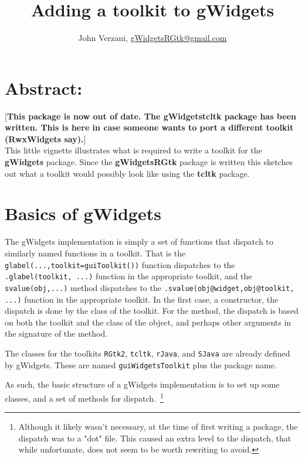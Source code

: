 \documentclass[12pt]{article}
\newcommand{\RCode}[1]{\texttt{#1}}
\newcommand{\RPackage}[1]{\textbf{#1}}
\begin{document}
\thispagestyle{plain}
\title{Adding a toolkit to gWidgets}

\author{John Verzani, \url{gWidgetsRGtk@gmail.com}}
\maketitle

\section*{Abstract:}
[\textbf{This package is now out of date. The \RPackage{gWidgetstcltk} package
has been written. This is here in case someone wants to port a
different toolkit (RwxWidgets say).}]
\\

This little vignette illustrates what is required to write a toolkit
for the \RPackage{gWidgets} package. Since the \RPackage{gWidgetsRGtk}
package is written this sketches out what a toolkit would possibly
look like using the \RPackage{tcltk} package.

\setcounter{tocdepth}{3}
\tableofcontents

\section{Basics of gWidgets}

The gWidgets implementation is simply a set of functions that dispatch
to similarly named functions in a toolkit. That is the
\RCode{glabel(...,toolkit=guiToolkit())} function dispatches to the
\RCode{.glabel(toolkit, ...)} function in the appropriate toolkit, and
the \RCode{svalue(obj,...)} method dispatches to the
\RCode{.svalue(obj@widget,obj@toolkit, ...)} function in the
appropriate toolkit. In the first case, a constructor, the dispatch is
done by the class of the toolkit. For the method, the dispatch is
based on both the toolkit and the class of the object, and perhaps
other arguments in the signature of the method.

The classes for the toolkits \RCode{RGtk2}, \RCode{tcltk}, \RCode{rJava}, and \RCode{SJava} are already defined by gWidgets. These are named \RCode{guiWidgetsToolkit} plus the package name.


As such, the basic structure of a gWidgets implementation is to set up
some classes, and a set of methods for dispatch.~\footnote{Although it
likely wasn't necessary, at the time of first writing a package, the
dispatch was to a "dot" file. This caused an extra level to the
dispatch, that while unfortunate, does not seem to be worth rewriting
to avoid.}
\end{document}
